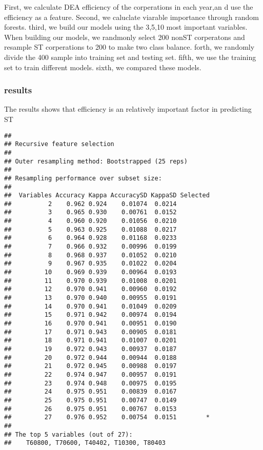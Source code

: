 \documentclass[]{article}
\begin{document}
First, we calculate DEA efficiency of the corperations in each year,an d
use the efficiency as a feature. Second, we caluclate viarable
importance through random forests. third, we build our models using the
3,5,10 most important variables. When building our models, we randmonly
select 200 nonST corperatons and resample ST corperations to 200 to make
two class balance. forth, we randomly divide the 400 sample into
training set and testing set. fifth, we use the training set to train
different models. sixth, we compared these models.

\subsubsection{results}\label{results}

The results shows that efficiency is an relatively important factor in
predicting ST

\begin{verbatim}
## 
## Recursive feature selection
## 
## Outer resampling method: Bootstrapped (25 reps) 
## 
## Resampling performance over subset size:
## 
##  Variables Accuracy Kappa AccuracySD KappaSD Selected
##          2    0.962 0.924    0.01074  0.0214         
##          3    0.965 0.930    0.00761  0.0152         
##          4    0.960 0.920    0.01056  0.0210         
##          5    0.963 0.925    0.01088  0.0217         
##          6    0.964 0.928    0.01168  0.0233         
##          7    0.966 0.932    0.00996  0.0199         
##          8    0.968 0.937    0.01052  0.0210         
##          9    0.967 0.935    0.01022  0.0204         
##         10    0.969 0.939    0.00964  0.0193         
##         11    0.970 0.939    0.01008  0.0201         
##         12    0.970 0.941    0.00960  0.0192         
##         13    0.970 0.940    0.00955  0.0191         
##         14    0.970 0.941    0.01049  0.0209         
##         15    0.971 0.942    0.00974  0.0194         
##         16    0.970 0.941    0.00951  0.0190         
##         17    0.971 0.943    0.00905  0.0181         
##         18    0.971 0.941    0.01007  0.0201         
##         19    0.972 0.943    0.00937  0.0187         
##         20    0.972 0.944    0.00944  0.0188         
##         21    0.972 0.945    0.00988  0.0197         
##         22    0.974 0.947    0.00957  0.0191         
##         23    0.974 0.948    0.00975  0.0195         
##         24    0.975 0.951    0.00839  0.0167         
##         25    0.975 0.951    0.00747  0.0149         
##         26    0.975 0.951    0.00767  0.0153         
##         27    0.976 0.952    0.00754  0.0151        *
## 
## The top 5 variables (out of 27):
##    T60800, T70600, T40402, T10300, T80403
\end{verbatim}
\end{document}
